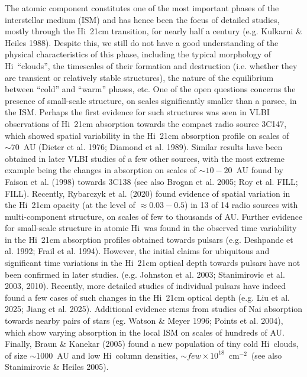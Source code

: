 \documentclass[11pt]{article}
\newcommand{\hi}{H{\sc i}}
\newcommand{\cm}{cm$^{-2}$}
\begin{document}
\vskip 0.05in 
The atomic component constitutes one of the most important phases of the 
interstellar medium (ISM) and has hence been the focus of detailed studies, mostly through the \hi~21cm transition, for nearly half a century (e.g. Kulkarni \& Heiles 1988). Despite this, we still do not have a good understanding of the physical characteristics of this phase, including the typical morphology of \hi\ ``clouds'', the timescales of their formation and destruction (i.e. whether they are transient or relatively stable structures), the nature of the equilibrium between ``cold'' and ``warm'' phases, etc. One of the open questions concerns the presence of small-scale structure, on scales significantly smaller than a parsec, in the ISM. Perhaps the first evidence for such structures was seen in VLBI observations of \hi~21cm absorption towards the compact radio source 3C147, which showed spatial variability in the \hi~21cm absorption profile on scales of $\sim 70$~AU (Dieter et al. 1976; Diamond et al. 1989). Similar results have been obtained in later VLBI studies of a few other sources, with the most extreme example being the changes in absorption on scales of $\sim 10-20$~AU found by Faison et al. (1998) towards 3C138 (see also Brogan et al. 2005; Roy et al. FILL; FILL). Recently, Rybarczyk et al. (2020) found evidence of spatial variation in the \hi~21cm opacity (at the level of $\approx 0.03-0.5$) in 13 of 14 radio sources with multi-component structure, on scales of few to thousands of AU. Further evidence for small-scale structure in atomic \hi\ was found in the observed time variability in the \hi~21cm absorption profiles obtained towards pulsars (e.g. Deshpande et al. 1992; Frail et al. 1994). However, the initial claims for ubiquitous and significant time variations in the \hi~21cm optical depth towards pulsars have not been confirmed in later studies. (e.g. Johnston et al. 2003; Stanimirovic et al. 2003, 2010). Recently, more detailed studies of individual pulsars have indeed found a few cases of such changes in the \hi~21cm optical depth (e.g. Liu et al. 2025; Jiang et al. 2025). Additional evidence stems from studies of Na{\sc i} absorption towards nearby pairs of stars (eg. Watson \& Meyer 1996; Points et al. 2004), which show varying absorption in the local ISM on scales of hundreds of AU. Finally, Braun \& Kanekar (2005) found a new population of tiny cold \hi\ clouds, of size $\sim 1000$~AU and low \hi\ column densities, $\sim few \times 10^{18}$~\cm\ (see also Stanimirovic \& Heiles 2005).
\end{document}
